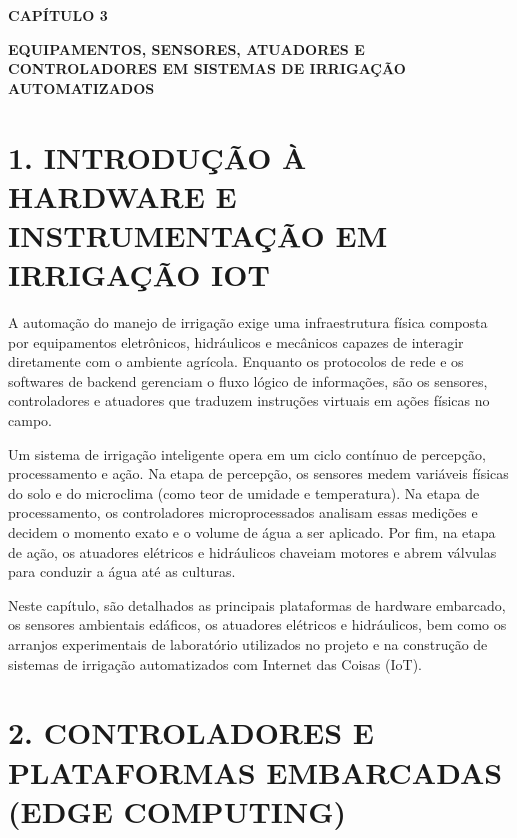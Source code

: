 
\begin{center}
\textbf{\fontsize{14}{16}\selectfont CAPÍTULO 3}

\vspace{0.5em}

\textbf{\fontsize{14}{16}\selectfont EQUIPAMENTOS, SENSORES, ATUADORES E CONTROLADORES EM SISTEMAS DE IRRIGAÇÃO AUTOMATIZADOS}
\end{center}

\vspace{1.5em}

\section*{1. INTRODUÇÃO À HARDWARE E INSTRUMENTAÇÃO EM IRRIGAÇÃO IOT}

A automação do manejo de irrigação exige uma infraestrutura física composta por equipamentos eletrônicos, hidráulicos e mecânicos capazes de interagir diretamente com o ambiente agrícola. Enquanto os protocolos de rede e os softwares de backend gerenciam o fluxo lógico de informações, são os sensores, controladores e atuadores que traduzem instruções virtuais em ações físicas no campo.

Um sistema de irrigação inteligente opera em um ciclo contínuo de percepção, processamento e ação. Na etapa de percepção, os sensores medem variáveis físicas do solo e do microclima (como teor de umidade e temperatura). Na etapa de processamento, os controladores microprocessados analisam essas medições e decidem o momento exato e o volume de água a ser aplicado. Por fim, na etapa de ação, os atuadores elétricos e hidráulicos chaveiam motores e abrem válvulas para conduzir a água até as culturas.

Neste capítulo, são detalhados as principais plataformas de hardware embarcado, os sensores ambientais edáficos, os atuadores elétricos e hidráulicos, bem como os arranjos experimentais de laboratório utilizados no projeto e na construção de sistemas de irrigação automatizados com Internet das Coisas (IoT).

\newpage

\section*{2. CONTROLADORES E PLATAFORMAS EMBARCADAS (EDGE COMPUTING)}

